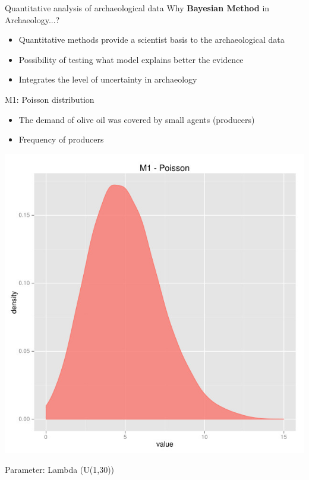 \documentclass[12pt, handout=show,notes=show]{beamer}
\begin{document}
\begin{frame}{Quantitative analysis of archaeological data}
 Why \textbf{Bayesian Method} in Archaeology...?\\
 \vspace{0.5cm}
\begin{itemize}
\item Quantitative methods provide a scientist basis to the archaeological data
\item Possibility of testing what model explains better the evidence 
\item Integrates the level of uncertainty in archaeology
\end{itemize}

\end{frame}


\begin{frame}{M1: Poisson distribution}
\begin{itemize}
\item The demand of olive oil was covered by small agents (producers)
\item Frequency of producers
\end{itemize}
\begin{center}
		\includegraphics[height=0.5\textwidth]{./poisson.jpg}
		\vfill
\end{center}	
\begin{center}
\tiny Parameter: Lambda (U(1,30))
\end{center}

\end{frame}
\end{document}
